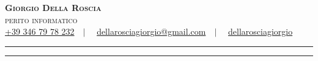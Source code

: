 \documentclass[a4paper, 10pt, oneside]{article}
\newcommand*{\img}[1]{
        \raisebox{-.3\baselineskip}{
            \texttt{[image: \#1]}
        }
    }
\begin{document}
    \begin{center}
        \huge{\textbf{\textsc{Giorgio Della Roscia}}}\\
        \Large{\textsc{perito informatico}}\\[3mm]
        \normalsize{
            \href{tel:+393467989232}{\img{phone}+39 346 79 78 232}$\quad\vert\quad$
            \href{mailto:dellarosciagiorgio@gmail.com}{\img{email}dellarosciagiorgio@gmail.com}$\quad\vert\quad$
            \href{https://github.com/dellarosciagiorgio}{\img{github}dellarosciagiorgio}
        }
        \vspace{1cm}
    \end{center}
    
    \vspace{7mm}\textcolor{black}{\hrule height 0.5mm}
    
    \textcolor{black}{\hrule height 0.5mm}
    
\end{document}
